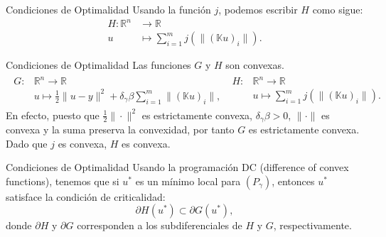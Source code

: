 \documentclass{beamer}
\begin{document}
\justify
\begin{frame}{Condiciones de Optimalidad}
Usando la función $j$, podemos escribir  $H$ como sigue:
\begin{align*}
    H:\mathbb{R}^n&\to \mathbb{R}\\
    u &\mapsto \sum_{i=1}^mj(\|(\mathbb{K}u)_i\|).
\end{align*}
\end{frame}
\justify
\begin{frame}{Condiciones de Optimalidad}
Las funciones $G$ y $H$ son convexas.
\begin{align*}
    \begin{array}{ll}
         G:& \mathbb{R}^n\to \mathbb{R} \\
         &u \mapsto \displaystyle\frac{1}{2}\|u-y\|^2+\delta_{\gamma}\beta\sum_{i=1}^m\|(\mathbb{K}u)_i\|, 
    \end{array}\;
    \begin{array}{ll}
        H:& \mathbb{R}^n\to \mathbb{R} \\
         &u \mapsto \displaystyle\sum_{i=1}^mj(\|(\mathbb{K}u)_i\|).
    \end{array}
    \end{align*}
En efecto, puesto que $\displaystyle \frac{1}{2}\|\cdot\|^2$ es estrictamente convexa, $\delta_{\gamma}\beta>0$, $\|\cdot\|$ es convexa y la suma
preserva la convexidad, por tanto $G$ es estrictamente convexa. Dado que $j$ es convexa, $H$ es convexa. 
\end{frame}
\justify
\begin{frame}{Condiciones de Optimalidad}
Usando la programación DC (difference of convex functions), tenemos que si $u^*$ es un mínimo local para $(P_\gamma)$, entonces $u^*$ satisface la condición de criticalidad: $$\partial H(u^*)\subset \partial G(u^*),$$
donde $\partial H$ y $\partial G$ corresponden a los subdiferenciales de $H$ y $G$, respectivamente.  
\end{frame}
\justify
\end{document}
